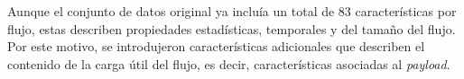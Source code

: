 Aunque el conjunto de datos original ya incluía un total de 83 características por flujo, estas describen propiedades estadísticas, temporales y del tamaño del flujo. Por este motivo, se introdujeron características adicionales que describen el contenido de la carga útil del flujo, es decir, características asociadas al \textit{payload}.